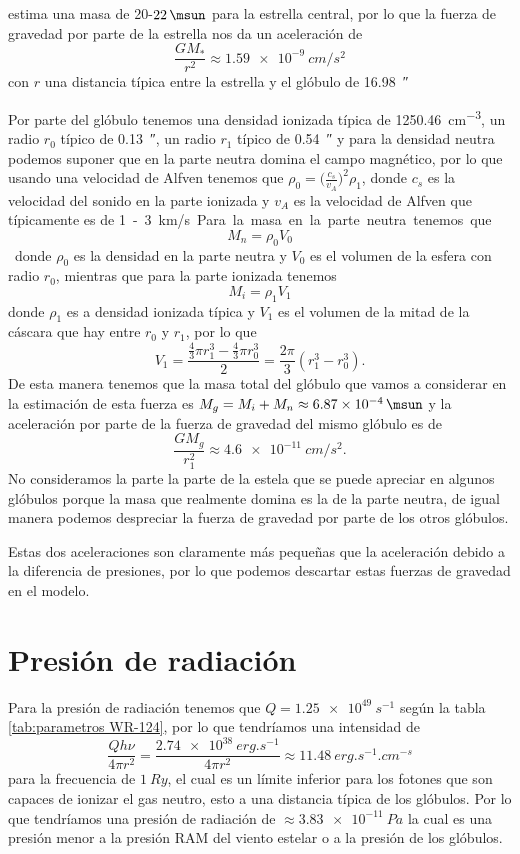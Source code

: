 \documentclass{book}
\begin{document}
\cite{Hamann:2019} estima una masa  de 20-$\SI{22}{\msun}$ para la estrella central, por lo que la fuerza de gravedad por parte de la estrella nos da un aceleración de 
\[\frac{GM_*}{r^2}\approx \SI{1.59e-9}{cm/s^2}\] con $r$ una distancia típica entre la estrella y el glóbulo de \SI{16.98}{\arcsecond}

Por parte del glóbulo tenemos una densidad ionizada típica de \SI{1250.46}{cm^{-3}}, un radio $r_0$ típico de \SI{.13}{\arcsecond}, un radio $r_1$ típico de \SI{.54}{\arcsecond} y para la densidad neutra podemos suponer que en la parte neutra domina el campo magnético, por lo que usando una velocidad de Alfven tenemos que $\rho_0 = \Big(\frac{c_s}{v_A}\Big)^2\rho_1$, donde $c_s$ es la velocidad del sonido en la parte ionizada y $v_A$ es la velocidad de Alfven que típicamente es de \SI{1}-\SI{3}{km/s}. Para la masa en la parte neutra tenemos que \[M_n = \rho_0 V_0\]
donde $\rho_0$ es la densidad en la parte neutra y $V_0$ es el volumen de la esfera con radio $r_0$, mientras que para la parte ionizada tenemos \[M_i = \rho_1 V_1\] donde $\rho_1$ es a densidad ionizada típica  y $V_1$ es el volumen de la mitad de la cáscara que hay entre $r_0$ y $r_1$, por lo que \[V_1 = \frac{\frac{4}{3}\pi r_1^3-\frac{4}{3}\pi r_0^3}{2}=\frac{2\pi}{3}(r_1^3-r_0^3).\] De esta manera tenemos que la masa total del glóbulo que vamos a considerar en la estimación de esta fuerza es $M_g = M_i + M_n \approx \SI{6.87e-4}{\msun}$ y la aceleración por parte de la fuerza de gravedad del mismo glóbulo es de
\[\frac{G M_g}{r_1^2}\approx \SI{4.6e-11}{cm/s^2}.\] No consideramos la parte la parte de la estela que se puede apreciar en algunos glóbulos porque la masa que realmente domina es la de la parte neutra, de igual manera podemos despreciar la fuerza de gravedad por parte de los otros glóbulos. 

Estas dos aceleraciones son claramente más pequeñas que la aceleración debido a la diferencia de presiones, por lo que podemos descartar estas fuerzas de gravedad en el modelo.

\section{Presión de radiación}

Para la presión de radiación tenemos que $Q = \SI{1.25e49}{s^{-1}}$ según la tabla \ref{tab:parametros WR-124}, por lo que tendríamos una intensidad de \[\frac{Q h\nu}{4\pi r^2} = \frac{\SI{2.74e38}{erg.s^{-1}}}{4\pi r^2} \approx \SI{11.48}{erg.s^{-1}.cm^{-s}}\] para la frecuencia de $\SI{1}{Ry}$, el cual es un límite inferior para los fotones que son capaces de ionizar el gas neutro, esto a una distancia típica de los glóbulos. Por lo que tendríamos una presión de radiación de $\approx \SI{3.83e-11}{Pa}$ la cual es una presión menor a la presión RAM del viento estelar o a la presión de los glóbulos.
\end{document}

